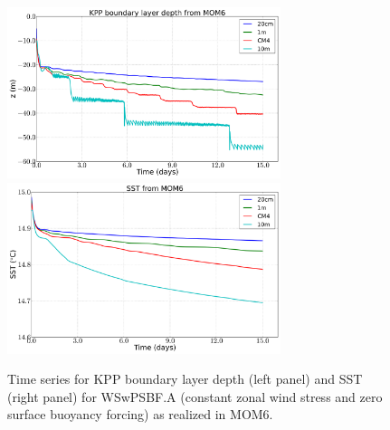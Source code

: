 \begin{figure}[h!t]
\begin{center}
\includegraphics[angle=0,width=8cm]{./figs/MOM6/WSwPSBF_A_MOM6_KPP_bldepth.png}
\includegraphics[angle=0,width=8cm]{./figs/MOM6/WSwPSBF_A_MOM6_SST.png}
\caption[KPP boundary layer depth and SST from MOM6 for WSwPSBF.A
]{\sf Time series for KPP boundary layer depth (left panel) and SST
  (right panel) for WSwPSBF.A (constant zonal wind stress and zero
  surface buoyancy forcing) as realized in MOM6.}
\label{fig:WSwPSBF_A_MOM6_SST_bldepth}
\end{center}
\end{figure}


